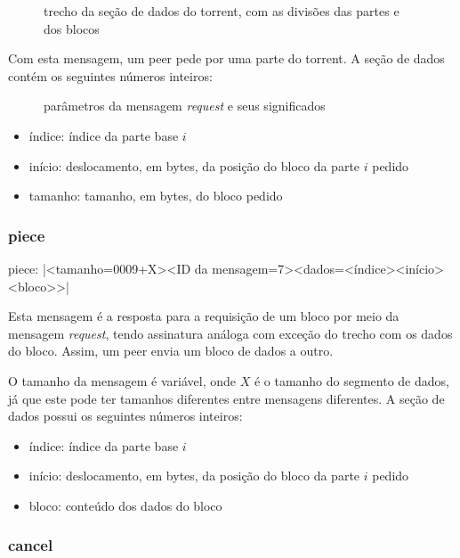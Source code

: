 \begin{figure}[H]
    \centering
    \caption{trecho da seção de dados do torrent, com as divisões das partes e dos
    blocos}
    \label{fig:partes}
\end{figure}

Com esta mensagem, um \gls*{peer} pede por uma parte do \gls*{torrent}. A seção de dados
contém os seguintes números inteiros:

\begin{figure}[ht!]
    \centering
    \caption{parâmetros da mensagem \emph{request} e seus significados}
    \label{fig:request}
\end{figure}

\begin{itemize}
    \item índice: índice da parte base $i$
    \item início: deslocamento, em bytes, da posição do bloco da parte $i$ pedido
    \item tamanho: tamanho, em bytes, do bloco pedido
\end{itemize}

\subsubsection*{piece}

piece: \bverb|<tamanho=0009+X><ID da mensagem=7><dados=<índice><início><bloco>>|

Esta mensagem é a resposta para a requisição de um bloco por meio da mensagem
\emph{request}, tendo assinatura análoga com exceção do trecho com os dados do bloco.
Assim, um \gls*{peer} envia um bloco de dados a outro.

O tamanho da mensagem é variável, onde $X$ é o tamanho do segmento de dados, já que
este pode ter tamanhos diferentes entre mensagens diferentes. A seção de dados possui
os seguintes números inteiros:

\begin{itemize}
    \item índice: índice da parte base $i$
    \item início: deslocamento, em bytes, da posição do bloco da parte $i$ pedido
    \item bloco: conteúdo dos dados do bloco
\end{itemize}

\subsubsection*{cancel}


